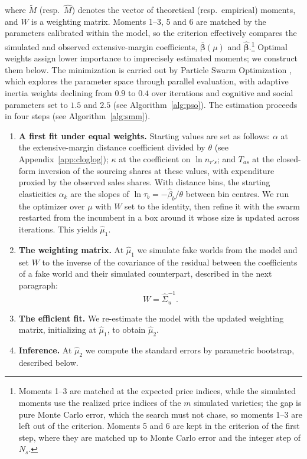 where $\tilde M$ (resp.\ $\hat M$) denotes the vector of theoretical (resp.\ empirical) moments, and $W$ is a weighting matrix. Moments 1--3, 5 and 6 are matched by the parameters calibrated within the model, so the criterion effectively compares the simulated and observed extensive-margin coefficients, $\bar{\boldsymbol\beta}(\mu)$ and $\hat{\boldsymbol\beta}$.\footnote{Moments 1--3 are matched at the expected price indices, while the simulated moments use the realized price indices of the $m$ simulated varieties; the gap is pure Monte Carlo error, which the search must not chase, so moments 1--3 are left out of the criterion. Moments 5 and 6 are kept in the criterion of the first step, where they are matched up to Monte Carlo error and the integer step of $N_s$.} Optimal weights assign lower importance to imprecisely estimated moments; we construct them below. The minimization is carried out by Particle Swarm Optimization \citep{pso}, which explores the parameter space through parallel evaluation, with adaptive inertia weights declining from $0.9$ to $0.4$ over iterations and cognitive and social parameters set to $1.5$ and $2.5$ (see Algorithm~\ref{alg:pso}). The estimation proceeds in four steps (see Algorithm~\ref{alg:smm}).

\begin{enumerate}

\item \textbf{A first fit under equal weights.} Starting values are set as follows: $\alpha$ at the extensive-margin distance coefficient divided by $\theta$ (see Appendix~\ref{app:cloglog}); $\kappa$ at the coefficient on $\ln n_{r's}$; and $T_{as}$ at the closed-form inversion of the sourcing shares at these values, with expenditure proxied by the observed sales shares. With distance bins, the starting elasticities $\alpha_k$ are the slopes of $\ln\tau_b=-\hat\beta_b/\theta$ between bin centres. We run the optimizer over $\mu$ with $W$ set to the identity, then refine it with the swarm restarted from the incumbent in a box around it whose size is updated across iterations. This yields $\hat\mu_{1}$.

\item \textbf{The weighting matrix.} At $\hat\mu_{1}$ we simulate fake worlds from the model and set $W$ to the inverse of the covariance of the residual between the coefficients of a fake world and their simulated counterpart, described in the next paragraph:
\begin{equation}
W=\hat\Sigma_u^{-1}.
\label{eq:app-W}
\end{equation}

\item \textbf{The efficient fit.} We re-estimate the model with the updated weighting matrix,
initializing at $\hat\mu_{1}$, to obtain $\hat\mu_{2}$.

\item \textbf{Inference.} At $\hat\mu_{2}$ we compute the standard errors by parametric bootstrap, described below.

\end{enumerate}

